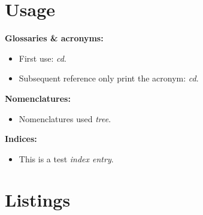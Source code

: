 \documentclass{article}
\begin{document}
\section{Usage}

\noindent
{\bf Glossaries \& acronyms:}
\begin{itemize}
    \item First use: {\it \gls{cd}}.
    \item Subsequent reference only print the acronym: {\it \gls{cd}}.
\end{itemize}

\noindent
{\bf Nomenclatures:}
\begin{itemize}
    \item Nomenclatures used {\it \gls{tree}}.
\end{itemize}

\noindent
{\bf Indices:}
\begin{itemize}
    \item This is a test {\it index entry}.
\end{itemize}

\section{Listings}

\printindex

\printglossaries
\end{document}
